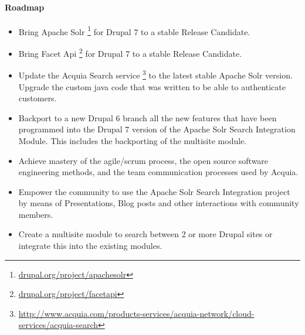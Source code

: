 \paragraph{Roadmap}
\begin{itemize}
  \item Bring Apache Solr \footnote{\url{drupal.org/project/apachesolr}} for Drupal 7 to a stable Release Candidate.
  \item Bring Facet Api \footnote{\url{drupal.org/project/facetapi}} for Drupal 7 to a stable Release Candidate.
  \item Update the Acquia Search service \footnote{\url{http://www.acquia.com/products-services/acquia-network/cloud-services/acquia-search}} to the latest stable Apache Solr version. Upgrade the custom java code that was written to be able to authenticate customers.
  \item Backport to a new Drupal 6 branch all the new features that have been programmed into the Drupal 7 version of the Apache Solr Search Integration Module. This includes the backporting of the multisite module.
  \item Achieve mastery of the agile/scrum process, the open source software engineering methods, and the team communication processes used by Acquia.
  \item Empower the community to use the Apache Solr Search Integration project by means of Presentations, Blog posts and other interactions with community members.
  \item Create a multisite module to search between 2 or more Drupal sites or integrate this into the existing modules.  
 \end{itemize}